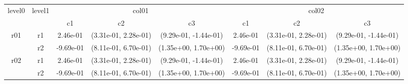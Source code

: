 \begin{tabular}{cccccccc}
\toprule
\multirow{2}{*}{level0} & \multirow{2}{*}{level1}&\multicolumn{3}{c}{col01}&\multicolumn{3}{c}{col02}\tabularnewline
\cmidrule(lr){3-5}
\cmidrule(lr){6-8}
&&c1&c2&c3&c1&c2&c3\tabularnewline
\midrule
\midrule
\multirow{2}{*}{r01}&r1&2.46e-01& (3.31e-01, 2.28e-01)& (9.29e-01, -1.44e-01)&2.46e-01& (3.31e-01, 2.28e-01)& (9.29e-01, -1.44e-01)\tabularnewline
&r2&-9.69e-01& (8.11e-01, 6.70e-01)& (1.35e+00, 1.70e+00)&-9.69e-01& (8.11e-01, 6.70e-01)& (1.35e+00, 1.70e+00)\tabularnewline
\midrule
\multirow{2}{*}{r02}&r1&2.46e-01& (3.31e-01, 2.28e-01)& (9.29e-01, -1.44e-01)&2.46e-01& (3.31e-01, 2.28e-01)& (9.29e-01, -1.44e-01)\tabularnewline
&r2&-9.69e-01& (8.11e-01, 6.70e-01)& (1.35e+00, 1.70e+00)&-9.69e-01& (8.11e-01, 6.70e-01)& (1.35e+00, 1.70e+00)\tabularnewline
\bottomrule
\end{tabular}
